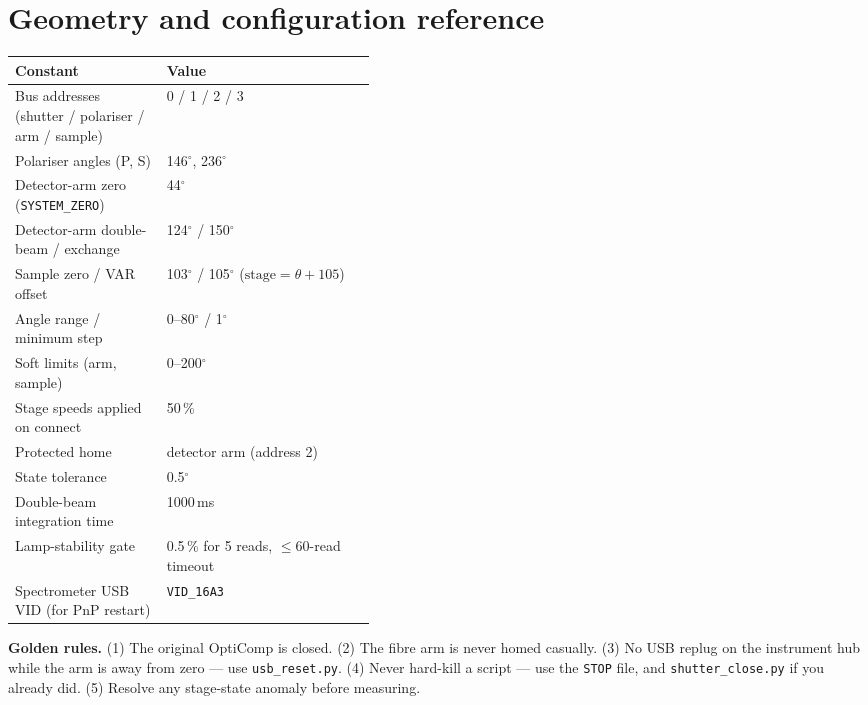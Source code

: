 \documentclass[11pt]{article}
\newcommand{\code}[1]{\texttt{\small #1}}
\begin{document}
\appendix
\section{Geometry and configuration reference}

\begin{center}
\begin{tabular}{>{\raggedright\arraybackslash}p{0.42\linewidth} l}
\toprule
\textbf{Constant} & \textbf{Value} \\
\midrule
Bus addresses (shutter / polariser / arm / sample) & 0 / 1 / 2 / 3 \\
Polariser angles (P, S) & 146$^\circ$, 236$^\circ$ \\
Detector-arm zero (\code{SYSTEM\_ZERO}) & 44$^\circ$ \\
Detector-arm double-beam / exchange & 124$^\circ$ / 150$^\circ$ \\
Sample zero / VAR offset & 103$^\circ$ / 105$^\circ$ ($\text{stage} = \theta + 105$) \\
Angle range / minimum step & 0--80$^\circ$ / 1$^\circ$ \\
Soft limits (arm, sample) & 0--200$^\circ$ \\
Stage speeds applied on connect & 50\,\% \\
Protected home & detector arm (address 2) \\
State tolerance & 0.5$^\circ$ \\
Double-beam integration time & 1000\,ms \\
Lamp-stability gate & 0.5\,\% for 5 reads, $\le$60-read timeout \\
Spectrometer USB VID (for PnP restart) & \code{VID\_16A3} \\
\bottomrule
\end{tabular}
\end{center}

\vspace{1em}
\begin{notebox}
\small \textbf{Golden rules.} (1) The original OptiComp is closed. (2) The fibre arm is never homed
casually. (3) No USB replug on the instrument hub while the arm is away from zero --- use
\code{usb\_reset.py}. (4) Never hard-kill a script --- use the \code{STOP} file, and
\code{shutter\_close.py} if you already did. (5) Resolve any stage-state anomaly before measuring.
\end{notebox}
\end{document}
